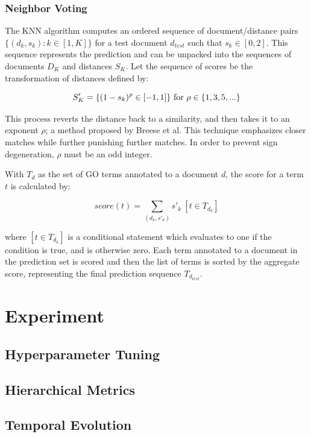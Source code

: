 \documentclass[11pt]{article} %
\theoremstyle{plain}
\theoremstyle{definition}
\begin{document}
\subsubsection{Neighbor Voting}
The KNN algorithm computes an ordered sequence of document/distance pairs \(\{(d_k, s_k) : k \in [1, K]\}\) for a test document \(d_{test}\) such that \(s_k \in [0,2]\). This sequence represents the prediction and can be unpacked into the sequences of documents \(D_K\) and distances \(S_K\). Let the sequence of scores be the transformation of distances defined by:

\[ S'_K = \{ (1-s_k)^{\rho} \in [-1, 1]\}\ \textnormal{for} \ \rho \in \{1,3,5,...\} \]

This process reverts the distance back to a similarity, and then takes it to an exponent \(\rho\); a method proposed by Breese et al. \cite{bresse/1998/emprirical} This technique emphasizes closer matches while further punishing further matches. In order to prevent sign degeneration, \(\rho\) must be an odd integer.

With \(T_d\) as the set of GO terms annotated to a document \(d\), the score for a term \(t\) is calculated by:

\[ score(t) = \sum_{(d_k, s'_k)}s'_k\ [t \in T_{d_k}]  \]

where \([t \in T_{d_k}]\) is a conditional statement which evaluates to one if the condition is true, and is otherwise zero. Each term annotated to a document in the prediction set is scored and then the list of terms is sorted by the aggregate score, representing the final prediction sequence \(T_{d_{test}}\).

\section{Experiment}

\subsection{Hyperparameter Tuning}

\subsection{Hierarchical Metrics}

\subsection{Temporal Evolution}
\end{document}
